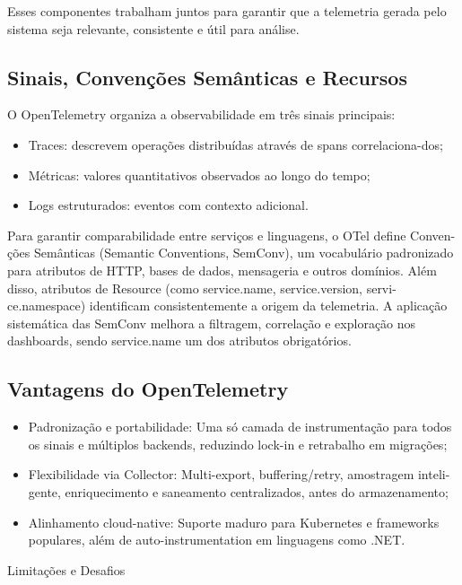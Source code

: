 Esses componentes trabalham juntos para garantir que a telemetria gerada pelo sistema seja relevante, consistente e útil para análise.

\subsection{Sinais, Convenções Semânticas e Recursos}

O OpenTelemetry organiza a observabilidade em três sinais principais:

\begin{itemize}
    \item Traces: descrevem operações distribuídas através de spans correlaciona-dos;
    \item Métricas: valores quantitativos observados ao longo do tempo;
    \item Logs estruturados: eventos com contexto adicional.
\end{itemize}

Para garantir comparabilidade entre serviços e linguagens, o OTel define Conven-ções Semânticas (Semantic Conventions, SemConv), um vocabulário padronizado para atributos de HTTP, bases de dados, mensageria e outros domínios.
Além disso, atributos de Resource (como service.name, service.version, servi-ce.namespace) identificam consistentemente a origem da telemetria. A aplicação sistemática das SemConv melhora a filtragem, correlação e exploração nos dashboards, sendo service.name um dos atributos obrigatórios.

\subsection{Vantagens do OpenTelemetry}

\begin{itemize}
    \item Padronização e portabilidade: Uma só camada de instrumentação para todos os sinais e múltiplos backends, reduzindo lock-in e retrabalho em migrações;
    \item Flexibilidade via Collector: Multi-export, buffering/retry, amostragem inteli-gente, enriquecimento e saneamento centralizados, antes do armazenamento;
    \item Alinhamento cloud-native: Suporte maduro para Kubernetes e frameworks populares, além de auto-instrumentation em linguagens como .NET.
\end{itemize}

Limitações e Desafios

